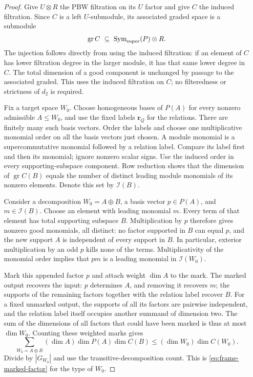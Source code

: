 \begin{proof}
Give $U\otimes R$ the PBW filtration on its $U$ factor and give $C$
the induced filtration.  Since $C$ is a left $U$-submodule, its
associated graded space is a submodule
\[
 \operatorname{gr} C\ \subseteq\
 \operatorname{Sym}_{\mathrm{super}}(P)\otimes R.
\]
The injection follows directly from using the induced filtration:
if an element of $C$ has lower filtration degree in the larger module,
it has that same lower degree in $C$.  The total dimension of a good
component is unchanged by passage to the associated graded.
This uses the induced filtration on $C$; no filteredness or strictness
of $d_2$ is required.

Fix a target space $W_0$.  Choose homogeneous bases of $P(A)$ for
every nonzero admissible $A\leq W_0$, and use the fixed labels
$\mathbf r_Q$ for the relations.  There are finitely many such basis
vectors.  Order the labels and choose one multiplicative monomial
order on all the basis vectors just chosen.  A module monomial is a
supercommutative monomial followed by a relation label.  Compare its
label first and then its monomial; ignore nonzero scalar signs.
Use the induced order in every supporting-subspace component.
Row reduction shows that the dimension of $\operatorname{gr} C(B)$
equals the number of distinct leading module monomials of its nonzero
elements.  Denote this set by $\mathcal I(B)$.

Consider a decomposition $W_0=A\oplus B$, a basis vector $p\in P(A)$,
and $m\in\mathcal I(B)$.  Choose an element with leading monomial $m$.
Every term of that element has total supporting subspace $B$.
Multiplication by $p$ therefore gives nonzero good monomials, all
distinct: no factor supported in $B$ can equal $p$, and the new
support $A$ is independent of every support in $B$.  In particular,
exterior multiplication by an odd $p$ kills none of the terms.
Multiplicativity of the monomial order implies that $pm$ is a leading
monomial in $\mathcal I(W_0)$.

Mark this appended factor $p$ and attach weight $\dim A$ to the mark.
The marked output recovers the input: $p$ determines $A$, and removing
it recovers $m$; the supports of the remaining factors together with
the relation label recover $B$.  For a fixed unmarked output, the
supports of all its factors are pairwise independent, and the relation
label itself occupies another summand of dimension two.  The sum of
the dimensions of all factors that could have been marked is thus
at most $\dim W_0$.  Counting these weighted marks gives
\[
 \sum_{W_0=A\oplus B}(\dim A)\dim P(A)\dim C(B)
   \leq (\dim W_0)\dim C(W_0).
\]
Divide by $|G_{W_0}|$ and use the transitive-decomposition count.
This is \eqref{eq:frame-marked-factor} for the type of $W_0$.
\end{proof}

